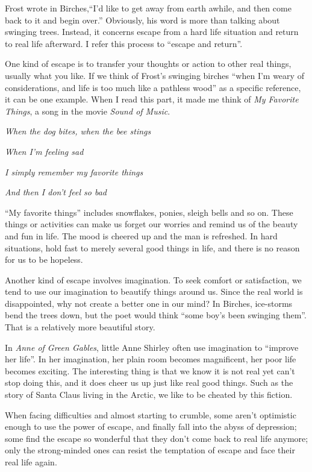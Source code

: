 \par Frost wrote in Birches,``I’d like to get away from earth awhile, and then come back to it and begin over.'' Obviously, his word is more than talking about swinging trees. Instead, it concerns escape from a hard life situation and return to real life afterward. I refer this process to ``escape and return''.
\par One kind of escape is to transfer your thoughts or action to other real things, usually what you like. If we think of Frost’s swinging birches ``when I’m weary of considerations, and life is too much like a pathless wood'' as a specific reference, it can be one example. When I read this part, it made me think of \emph{My Favorite Things}, a song in the movie \emph{Sound of Music}. 
\par \setlength{\parindent}{2em}\emph{When the dog bites, when the bee stings}
\par \emph{When I’m feeling sad}
\par \emph{I simply remember my favorite things}
\par \emph{And then I don’t feel so bad}
\par “My favorite things” includes snowflakes, ponies, sleigh bells and so on. These things or activities can make us forget our worries and remind us of the beauty and fun in life. The mood is cheered up and the man is refreshed. In hard situations, hold fast to merely several good things in life, and there is no reason for us to be hopeless.
\par Another kind of escape involves imagination. To seek comfort or satisfaction, we tend to use our imagination to beautify things around us. Since the real world is disappointed, why not create a better one in our mind? In Birches, ice-storms bend the trees down, but the poet would think “some boy’s been swinging them”. That is a relatively more beautiful story. 
\par In \emph{Anne of Green Gables}, little Anne Shirley often use imagination to “improve her life”. In her imagination, her plain room becomes magnificent, her poor life becomes exciting. The interesting thing is that we know it is not real yet can’t stop doing this, and it does cheer us up just like real good things. Such as the story of Santa Claus living in the Arctic, we like to be cheated by this fiction.
\par When facing difficulties and almost starting to crumble, some aren’t optimistic enough to use the power of escape, and finally fall into the abyss of depression; some find the escape so wonderful that they don’t come back to real life anymore; only the strong-minded ones can resist the temptation of escape and face their real life again.

